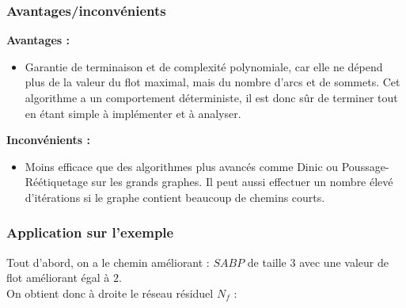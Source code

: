 \documentclass[a4paper]{article}
\begin{document}
\subsubsection{Avantages/inconvénients}
\textbf{Avantages :}
\begin{itemize}
    \item Garantie de terminaison et de complexité polynomiale, car elle ne dépend plus de la valeur du flot maximal, mais du nombre d'arcs et de sommets. Cet algorithme a un comportement déterministe, il est donc sûr de terminer tout en étant simple à implémenter et à analyser.
\end{itemize}

\textbf{Inconvénients :}
\begin{itemize}
    \item Moins efficace que des algorithmes plus avancés comme Dinic ou Poussage-Réétiquetage sur les grands graphes. Il peut aussi effectuer un nombre élevé d’itérations si le graphe contient beaucoup de chemins courts.
\end{itemize}
\subsubsection{Application sur l'exemple}
Tout d'abord, on a le chemin améliorant : $SABP$ de taille $3$ avec une valeur de flot améliorant égal à $2$.\\
On obtient donc à droite le réseau résiduel $N_f$ :
\end{document}
